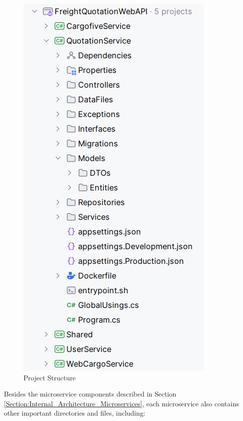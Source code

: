 \documentclass[12pt, reqno, oneside]{amsbook}
\theoremstyle{definition}
\theoremstyle{definition}
\numberwithin{section}{chapter}
\numberwithin{table}{chapter}
\numberwithin{figure}{chapter}
\begin{document}
\begin{figure}[H]
  \centering
  \includegraphics[width=0.55\linewidth]{images/ProjectStructure.png}
  \caption{\label{Figure:ProjectStructure}Project Structure}
\end{figure}

Besides the microservice components described in Section \ref{Section:Internal_Architecture_Microservices}, each microservice also contains other important directories and files, including:
\end{document}

